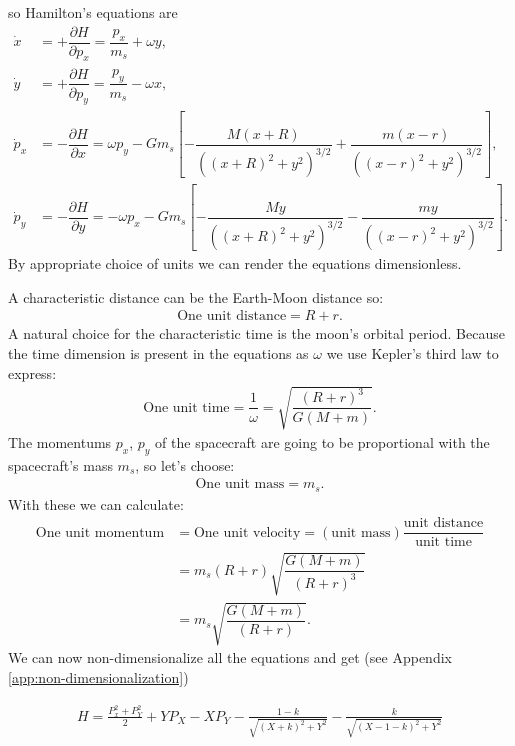 so Hamilton's equations are
\begin{align}
\dot{x} &= +\dfrac{\partial H}{\partial p_x} = \dfrac{p_x}{m_s} + \omega y, \\[0.4cm]
\dot{y} &= +\dfrac{\partial H}{\partial p_y} = \dfrac{p_y}{m_s} - \omega x, \\[0.4cm]
\dot{p}_x &= -\dfrac{\partial H}{\partial x} = \omega p_y - G m_s \left[-\dfrac{M(x+R)}{((x+R)^2+y^2)^{3/2}} + \dfrac{m(x-r)}{((x-r)^2+y^2)^{3/2}} \right], \\[0.4cm]
\dot{p}_y &= -\dfrac{\partial H}{\partial y} = -\omega p_x - G m_s \left[- \dfrac{M y}{((x+R)^2+y^2)^{3/2}} - \dfrac{m y}{((x-r)^2+y^2)^{3/2}}\right].
\end{align}
By appropriate choice of units we can render the equations dimensionless.

A characteristic distance can be the Earth-Moon distance so:
\begin{align}
\text{One unit distance} = R+r .
\end{align}
A natural choice for the characteristic time is the moon's orbital period. Because the time dimension is present in the equations as $\omega$ we use Kepler's third law to express: \cite{Murray1999}
\begin{align}
\text{One unit time} = \dfrac{1}{\omega} = \sqrt{\dfrac{(R+r)^3}{G(M+m)}}.
\end{align}
The momentums $p_x$, $p_y$ of the spacecraft are going to be proportional with the spacecraft's mass $m_s$, so let's choose:
\begin{align}
\text{One unit mass} = m_s.
\end{align}
With these we can calculate:
\begin{align}
\nonumber \text{One unit momentum} &= \text{One unit velocity} = (\text{unit mass})\dfrac{\text{unit distance}}{\text{unit time}} \\[0.3cm]
\nonumber &= m_s(R+r)\sqrt{\dfrac{G(M+m)}{(R+r)^3}} \\[0.3cm]
&= m_s \sqrt{\dfrac{G(M+m)}{(R+r)}}.
\end{align}
We can now non-dimensionalize all the equations and get (see Appendix \ref{app:non-dimensionalization})

\begin{align}
  H = \frac{P_x^2 + P_Y^2}{2} + Y P_X - X P_Y - \frac{1 -k}{\sqrt{(X+k)^2 + Y^2 }} - \frac{k}{\sqrt{(X-1-k)^2 + Y^2}}
\end{align}

